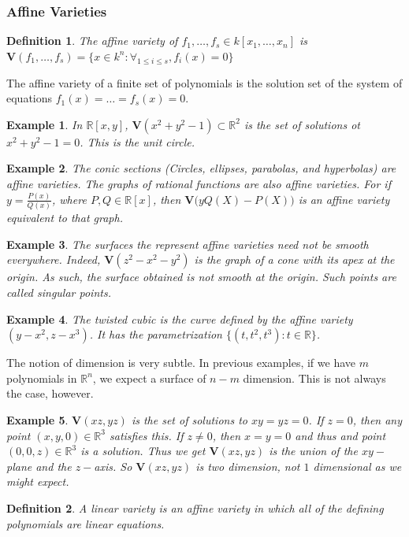 \documentclass[oneside]{book}
\theoremstyle{mystyle}
\newtheorem{definition}{Definition}[section]
\newtheorem{example}{Example}[section]
\begin{document}
\subsubsection{Affine Varieties}
\begin{definition}
The affine variety of $f_1,\hdots, f_s \in k[x_1,\hdots ,x_n]$ is $\mathbf{V}(f_1,\hdots, f_s) = \{x\in k^n:\forall_{1\leq i \leq s},f_i(x) = 0\}$
\end{definition}
The affine variety of a finite set of polynomials is the solution set of the system of equations $f_1(x) = \hdots = f_s(x) = 0$. 
\begin{example}
In $\mathbb{R}[x,y]$, $\mathbf{V}(x^2+y^2-1) \subset \mathbb{R}^2$ is the set of solutions ot $x^2+y^2-1 = 0$. This is the unit circle.
\end{example}
\begin{example}
The conic sections (Circles, ellipses, parabolas, and hyperbolas) are affine varieties. The graphs of rational functions are also affine varieties. For if $y = \frac{P(x)}{Q(x)}$, where $P,Q\in \mathbb{R}[x]$, then $\mathbf{V}\big(yQ(X)-P(X)\big)$ is an affine variety equivalent to that graph.
\end{example}
\begin{example}
The surfaces the represent affine varieties need not be smooth everywhere. Indeed, $\mathbf{V}(z^2-x^2-y^2)$ is the graph of a cone with its apex at the origin. As such, the surface obtained is not smooth at the origin. Such points are called singular points.
\end{example}
\begin{example}
The twisted cubic is the curve defined by the affine variety $(y-x^2,z-x^3)$. It has the parametrization $\{(t,t^2,t^3):t\in \mathbb{R}\}$.
\end{example}
The notion of dimension is very subtle. In previous examples, if we have $m$ polynomials in $\mathbb{R}^n$, we expect a surface of $n-m$ dimension. This is not always the case, however.
\begin{example}
$\mathbf{V}(xz,yz)$ is the set of solutions to $xy=yz = 0$. If $z = 0$, then any point $(x,y,0)\in \mathbb{R}^3$ satisfies this. If $z\ne 0$, then $x=y=0$ and thus and point $(0,0,z)\in \mathbb{R}^3$ is a solution. Thus we get $\mathbf{V}(xz,yz)$ is the union of the $xy-$plane and the $z-$axis. So $\mathbf{V}(xz,yz)$ is two dimension, not $1$ dimensional as we might expect.
\end{example}
\begin{definition}
A linear variety is an affine variety in which all of the defining polynomials are linear equations.
\end{definition}
\end{document}
